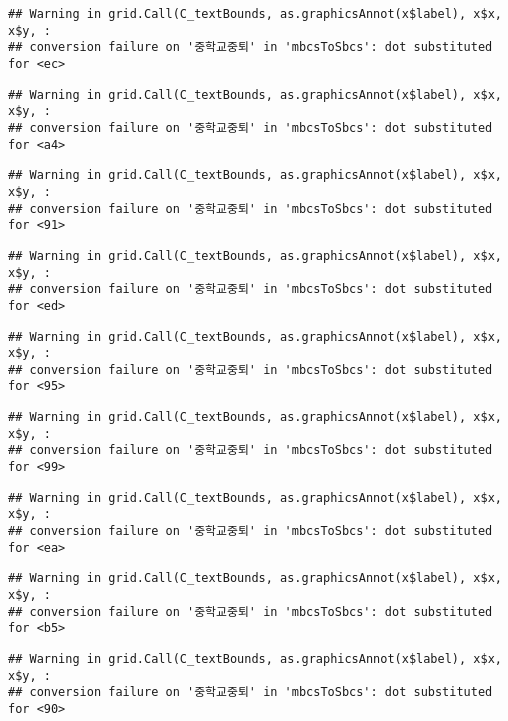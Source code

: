 \documentclass[
]{article}
\begin{document}
\begin{verbatim}
## Warning in grid.Call(C_textBounds, as.graphicsAnnot(x$label), x$x, x$y, :
## conversion failure on '중학교중퇴' in 'mbcsToSbcs': dot substituted for <ec>
\end{verbatim}

\begin{verbatim}
## Warning in grid.Call(C_textBounds, as.graphicsAnnot(x$label), x$x, x$y, :
## conversion failure on '중학교중퇴' in 'mbcsToSbcs': dot substituted for <a4>
\end{verbatim}

\begin{verbatim}
## Warning in grid.Call(C_textBounds, as.graphicsAnnot(x$label), x$x, x$y, :
## conversion failure on '중학교중퇴' in 'mbcsToSbcs': dot substituted for <91>
\end{verbatim}

\begin{verbatim}
## Warning in grid.Call(C_textBounds, as.graphicsAnnot(x$label), x$x, x$y, :
## conversion failure on '중학교중퇴' in 'mbcsToSbcs': dot substituted for <ed>
\end{verbatim}

\begin{verbatim}
## Warning in grid.Call(C_textBounds, as.graphicsAnnot(x$label), x$x, x$y, :
## conversion failure on '중학교중퇴' in 'mbcsToSbcs': dot substituted for <95>
\end{verbatim}

\begin{verbatim}
## Warning in grid.Call(C_textBounds, as.graphicsAnnot(x$label), x$x, x$y, :
## conversion failure on '중학교중퇴' in 'mbcsToSbcs': dot substituted for <99>
\end{verbatim}

\begin{verbatim}
## Warning in grid.Call(C_textBounds, as.graphicsAnnot(x$label), x$x, x$y, :
## conversion failure on '중학교중퇴' in 'mbcsToSbcs': dot substituted for <ea>
\end{verbatim}

\begin{verbatim}
## Warning in grid.Call(C_textBounds, as.graphicsAnnot(x$label), x$x, x$y, :
## conversion failure on '중학교중퇴' in 'mbcsToSbcs': dot substituted for <b5>
\end{verbatim}

\begin{verbatim}
## Warning in grid.Call(C_textBounds, as.graphicsAnnot(x$label), x$x, x$y, :
## conversion failure on '중학교중퇴' in 'mbcsToSbcs': dot substituted for <90>
\end{verbatim}
\end{document}
